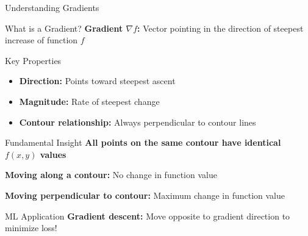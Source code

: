 \documentclass[10pt]{beamer}
\begin{document}
\begin{frame}{Understanding Gradients}
\begin{definitionbox}{What is a Gradient?}
\textbf{Gradient $\nabla f$:} Vector pointing in the direction of steepest increase of function $f$
\end{definitionbox}

\begin{keypointsbox}{Key Properties}
\begin{itemize}
\item \textbf{Direction:} Points toward steepest ascent
\item \textbf{Magnitude:} Rate of steepest change
\item \textbf{Contour relationship:} Always perpendicular to contour lines
\end{itemize}
\end{keypointsbox}

\begin{examplebox}{Fundamental Insight}
\textbf{All points on the same contour have identical $f(x,y)$ values}

\textbf{Moving along a contour:} No change in function value

\textbf{Moving perpendicular to contour:} Maximum change in function value
\end{examplebox}

\begin{alertbox}{ML Application}
\textbf{Gradient descent:} Move opposite to gradient direction to minimize loss!
\end{alertbox}
\end{frame}
\end{document}
